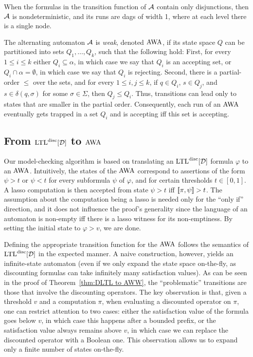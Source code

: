 \documentclass{llncs}
\newcommand{\LTL}{{\ensuremath{\rm LTL}}\xspace}
\newcommand{\AWW}{\mbox{\rm AWA}\xspace}
\newcommand{\D}{{\cal D}}
\newcommand{\A}{{\cal A}}
\renewcommand{\phi}{\varphi}
\newcommand{\DLTL}{\ensuremath{\LTL^{\text{disc}}[\D]}}
\newcommand{\LTLD}{\DLTL}
\begin{document}
When the formulas in the transition function of $\A$ contain only disjunctions, then $\A$ is  nondeterministic, and its runs are {\sc dag}s of width 1, where at each level there is a single node. 

The alternating automaton $\A$ is {\em weak\/}, denoted $\AWW$, if its state space $Q$ can be partitioned into sets $Q_1,\ldots,Q_k$, such that the following hold: First, for every $1\le i\le k$ either $Q_i\subseteq \alpha$, in which case we say that $Q_i$ is an accepting set,  or $Q_i\cap \alpha=\emptyset$, in which case we say that $Q_i$ is rejecting. Second, there is a partial-order $\leq$ over the sets, and for every $1\le i, j\le k$, if $q\in Q_i$, $s\in Q_j$, and $s \in \delta(q,\sigma)$ for some $\sigma\in \Sigma$, then $Q_j \leq Q_i$. Thus, transitions can lead only to states that are smaller in the partial order. Consequently, each run of an $\AWW$ eventually gets trapped in a set $Q_i$ and is accepting iff this set is accepting. 


\subsection{From $\DLTL$ to $\AWW$}\label{sec:DltlToAww}
Our model-checking algorithm is based on translating an $\DLTL$ formula $\phi$ to an $\AWW$.
Intuitively, the states of the $\AWW$ correspond to assertions of the form $\psi>t$ or $\psi<t$ for every subformula $\psi$ of $\phi$, and for certain thresholds $t\in [0,1]$. 
A lasso computation is then accepted from state $\psi>t$ iff $[\![\pi,\psi]\!]>t$. The assumption about the computation being a lasso is needed only for the ``only if'' direction, and it does not influence the proof's generality since the language of an automaton is non-empty iff there is a lasso witness for its non-emptiness. By setting the initial state to $\phi>v$, we are done. 

Defining the appropriate transition function for the $\AWW$ follows the semantics of $\LTLD$ in the expected manner. A naive construction, however, yields an infinite-state automaton (even if we only expand the state space on-the-fly, as discounting formulas can take infinitely many satisfaction values).
As can be seen in the proof of Theorem~\ref{thm:DLTL to AWW}, the ``problematic'' transitions are those that involve the discounting operators. The key observation is that, given a threshold $v$ and a computation $\pi$, when evaluating a discounted operator on $\pi$, one can restrict attention to two cases: either the satisfaction value of the formula goes below $v$, in which case this happens after a bounded prefix, or the satisfaction value always remains above $v$, in which case we can replace the discounted operator with a Boolean one. This observation allows us to expand only a finite number of states on-the-fly.
\end{document}
